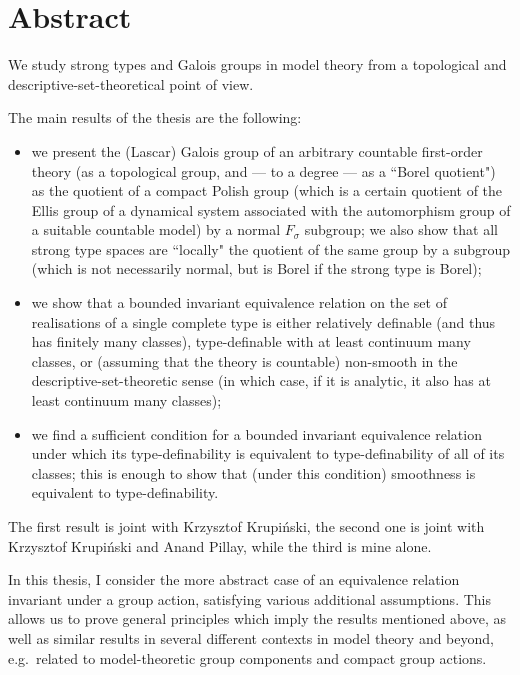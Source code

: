 \documentclass[12pt,a4paper,final]{book}
\theoremstyle{remark}
\theoremstyle{definition}
\begin{document}
	
	
	\section*{Abstract}
	\thispagestyle{headings}
	\vspace{-.5\baselineskip}
	We study strong types and Galois groups in model theory from a topological and descriptive-set-theoretical point of view.
	
	The main results of the thesis are the following:
	\begin{itemize}
		\item
		we present the (Lascar) Galois group of an arbitrary countable first-order theory (as a topological group, and --- to a degree --- as a ``Borel quotient") as the quotient of a compact Polish group (which is a certain quotient of the Ellis group of a dynamical system associated with the automorphism group of a suitable countable model) by a normal $F_\sigma$ subgroup; we also show that all strong type spaces are ``locally" the quotient of the same group by a subgroup (which is not necessarily normal, but is Borel if the strong type is Borel);
		\item
		we show that a bounded invariant equivalence relation on the set of realisations of a single complete type is either relatively definable (and thus has finitely many classes), type-definable with at least continuum many classes, or (assuming that the theory is countable) non-smooth in the descriptive-set-theoretic sense (in which case, if it is analytic, it also has at least continuum many classes);
		\item
		we find a sufficient condition for a bounded invariant equivalence relation under which its type-definability is equivalent to type-definability of all of its classes; this is enough to show that (under this condition) smoothness is equivalent to type-definability.
	\end{itemize}
	The first result is joint with Krzysztof Krupiński, the second one is joint with Krzysztof Krupiński and Anand Pillay, while the third is mine alone.
	
	In this thesis, I consider the more abstract case of an equivalence relation invariant under a group action, satisfying various additional assumptions. This allows us to prove general principles which imply the results mentioned above, as well as similar results in several different contexts in model theory and beyond, e.g.\ related to model-theoretic group components and compact group actions.
	
\end{document}
